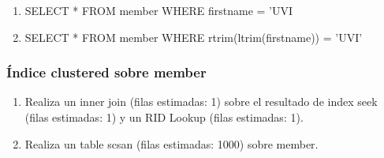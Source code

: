 \begin{enumerate}[label=(\alph*)]
\item SELECT * FROM member WHERE firstname = ’UVI
\item SELECT * FROM member WHERE rtrim(ltrim(firstname)) = ’UVI’
\end{enumerate}

\subsubsection{Índice clustered sobre member}
\begin{enumerate}[label=(\alph*)]
\item Realiza un inner join (filas estimadas: 1) sobre el resultado de index seek (filas estimadas: 1) y un RID Lookup (filas estimadas: 1).
\item Realiza un table scsan (filas estimadas: 1000) sobre member.
\end{enumerate}

